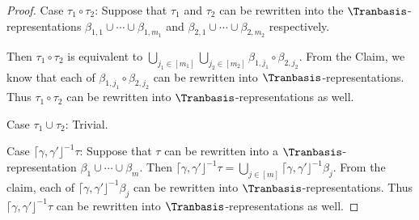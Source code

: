 \begin{proof}
	
	Case $\tau_1 \circ \tau_2$: Suppose that  $\tau_1$ and $\tau_2$ can be rewritten into the $\Tranbasis$-representations $ \beta_{1,1} \cup \cdots \cup \beta_{1, m_1}$ and $\beta_{2,1} \cup \cdots \cup \beta_{2, m_2}$  respectively.
	
	Then $\tau_1 \circ \tau_2$ is equivalent to $\bigcup \limits_{j_1 \in [m_1]} \bigcup \limits_{j_2 \in [m_2]} \beta_{1, j_1} \circ \beta_{2, j_2}$. From the Claim, we know that each of $ \beta_{1, j_1} \circ \beta_{2, j_2}$ can be rewritten into $\Tranbasis$-representations. Thus $\tau_1 \circ \tau_2$ can be rewritten into $\Tranbasis$-representations as well.
	
	Case $\tau_1 \cup \tau_2$: Trivial.
	
	Case $\lceil \gamma, \gamma' \rfloor^{-1} \tau$: Suppose that $\tau$ can be rewritten into a $\Tranbasis$-representation $ \beta_{1} \cup \cdots \cup \beta_{m}$. 
	Then $\lceil \gamma, \gamma' \rfloor^{-1} \tau = \bigcup \limits_{j \in [m]} \lceil \gamma, \gamma' \rfloor^{-1} \beta_j$. From the claim, each of $\lceil \gamma, \gamma' \rfloor^{-1} \beta_j$ can be rewritten into $\Tranbasis$-representations. Thus $\lceil \gamma, \gamma' \rfloor^{-1} \tau$ can be rewritten into $\Tranbasis$-representations as well.
\end{proof}

